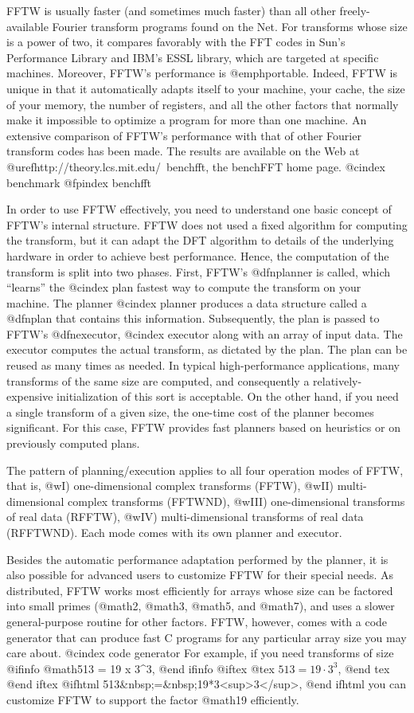 FFTW is usually faster (and sometimes much faster) than all other
freely-available Fourier transform programs found on the Net.  For
transforms whose size is a power of two, it compares favorably with the
FFT codes in Sun's Performance Library and IBM's ESSL library, which are
targeted at specific machines.  Moreover, FFTW's performance is
@emph{portable}.  Indeed, FFTW is unique in that it automatically adapts
itself to your machine, your cache, the size of your memory, the number
of registers, and all the other factors that normally make it impossible
to optimize a program for more than one machine.  An extensive
comparison of FFTW's performance with that of other Fourier transform
codes has been made. The results are available on the Web at
@uref{http://theory.lcs.mit.edu/~benchfft, the benchFFT home page}.
@cindex benchmark
@fpindex benchfft

In order to use FFTW effectively, you need to understand one basic
concept of FFTW's internal structure.  FFTW does not used a fixed
algorithm for computing the transform, but it can adapt the DFT
algorithm to details of the underlying hardware in order to achieve best
performance.  Hence, the computation of the transform is split into two
phases.  First, FFTW's @dfn{planner} is called, which ``learns'' the
@cindex plan
fastest way to compute the transform on your machine.  The planner
@cindex planner
produces a data structure called a @dfn{plan} that contains this
information.  Subsequently, the plan is passed to FFTW's @dfn{executor},
@cindex executor
along with an array of input data.  The executor computes the actual
transform, as dictated by the plan.  The plan can be reused as many
times as needed.  In typical high-performance applications, many
transforms of the same size are computed, and consequently a
relatively-expensive initialization of this sort is acceptable.  On the
other hand, if you need a single transform of a given size, the one-time
cost of the planner becomes significant.  For this case, FFTW provides
fast planners based on heuristics or on previously computed plans.

The pattern of planning/execution applies to all four operation modes of
FFTW, that is, @w{I) one-dimensional} complex transforms (FFTW), @w{II)
multi-dimensional} complex transforms (FFTWND), @w{III) one-dimensional}
transforms of real data (RFFTW), @w{IV) multi-dimensional} transforms of
real data (RFFTWND).  Each mode comes with its own planner and executor.

Besides the automatic performance adaptation performed by the planner,
it is also possible for advanced users to customize FFTW for their
special needs.  As distributed, FFTW works most efficiently for arrays
whose size can be factored into small primes (@math{2}, @math{3},
@math{5}, and @math{7}), and uses a slower general-purpose routine for
other factors.  FFTW, however, comes with a code generator that can
produce fast C programs for any particular array size you may care
about.
@cindex code generator
For example, if you need transforms of size
@ifinfo
@math{513 = 19 x 3^3},
@end ifinfo
@iftex
@tex
$513 = 19 \cdot 3^3$,
@end tex
@end iftex
@ifhtml
513&nbsp;=&nbsp;19*3<sup>3</sup>,
@end ifhtml
you can customize FFTW to support the factor @math{19} efficiently.

